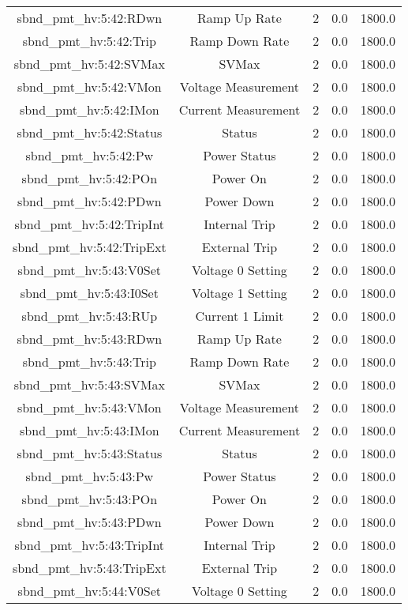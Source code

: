 \begin{table}[ptb]
\begin{tabular}{c | c c c c}
sbnd_pmt_hv:5:42:RDwn & Ramp Up Rate & 2 & 0.0 & 1800.0\\ 
sbnd_pmt_hv:5:42:Trip & Ramp Down Rate & 2 & 0.0 & 1800.0\\ 
sbnd_pmt_hv:5:42:SVMax & SVMax & 2 & 0.0 & 1800.0\\ 
sbnd_pmt_hv:5:42:VMon & Voltage Measurement & 2 & 0.0 & 1800.0\\ 
sbnd_pmt_hv:5:42:IMon & Current Measurement & 2 & 0.0 & 1800.0\\ 
sbnd_pmt_hv:5:42:Status & Status & 2 & 0.0 & 1800.0\\ 
sbnd_pmt_hv:5:42:Pw & Power Status & 2 & 0.0 & 1800.0\\ 
sbnd_pmt_hv:5:42:POn & Power On & 2 & 0.0 & 1800.0\\ 
sbnd_pmt_hv:5:42:PDwn & Power Down & 2 & 0.0 & 1800.0\\ 
sbnd_pmt_hv:5:42:TripInt & Internal Trip & 2 & 0.0 & 1800.0\\ 
sbnd_pmt_hv:5:42:TripExt & External Trip & 2 & 0.0 & 1800.0\\ 
sbnd_pmt_hv:5:43:V0Set & Voltage 0 Setting & 2 & 0.0 & 1800.0\\ 
sbnd_pmt_hv:5:43:I0Set & Voltage 1 Setting & 2 & 0.0 & 1800.0\\ 
sbnd_pmt_hv:5:43:RUp & Current 1 Limit & 2 & 0.0 & 1800.0\\ 
sbnd_pmt_hv:5:43:RDwn & Ramp Up Rate & 2 & 0.0 & 1800.0\\ 
sbnd_pmt_hv:5:43:Trip & Ramp Down Rate & 2 & 0.0 & 1800.0\\ 
sbnd_pmt_hv:5:43:SVMax & SVMax & 2 & 0.0 & 1800.0\\ 
sbnd_pmt_hv:5:43:VMon & Voltage Measurement & 2 & 0.0 & 1800.0\\ 
sbnd_pmt_hv:5:43:IMon & Current Measurement & 2 & 0.0 & 1800.0\\ 
sbnd_pmt_hv:5:43:Status & Status & 2 & 0.0 & 1800.0\\ 
sbnd_pmt_hv:5:43:Pw & Power Status & 2 & 0.0 & 1800.0\\ 
sbnd_pmt_hv:5:43:POn & Power On & 2 & 0.0 & 1800.0\\ 
sbnd_pmt_hv:5:43:PDwn & Power Down & 2 & 0.0 & 1800.0\\ 
sbnd_pmt_hv:5:43:TripInt & Internal Trip & 2 & 0.0 & 1800.0\\ 
sbnd_pmt_hv:5:43:TripExt & External Trip & 2 & 0.0 & 1800.0\\ 
sbnd_pmt_hv:5:44:V0Set & Voltage 0 Setting & 2 & 0.0 & 1800.0\\ 

\end{tabular}
\end{table}
